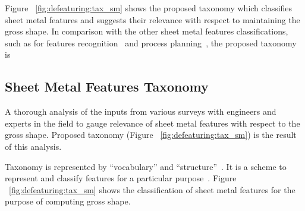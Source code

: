 Figure ~\ref{fig:defeaturing:tax_sm} shows the proposed taxonomy which classifies sheet metal features and suggests their relevance with respect to maintaining the gross shape. In comparison with the other sheet metal features classifications, such as for features recognition~\cite{Gupta2013, Gupta2013a} and process planning~\cite{Kannan2009}, the proposed taxonomy is 
%
%
\subsection{Sheet Metal Features Taxonomy}\label{sec:defeaturing:phase11}

A thorough analysis of the inputs from various surveys with engineers and experts in the field to gauge relevance of sheet metal features with respect to the gross shape.  Proposed  taxonomy (Figure ~\ref{fig:defeaturing:tax_sm}) is the result of this analysis.

Taxonomy is represented by ``vocabulary'' and ``structure''~\cite{Tessier2011}. It is a scheme to represent and classify features for a particular purpose~\cite{Dartigues2005}.  Figure ~\ref{fig:defeaturing:tax_sm} shows the classification of sheet metal features for the purpose of computing gross shape.



